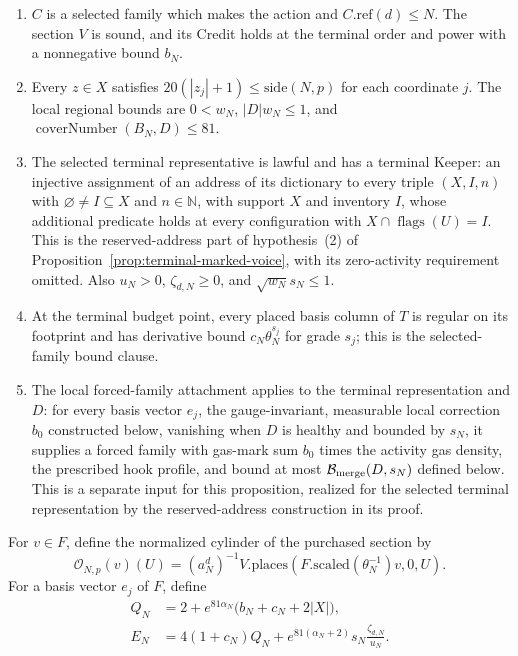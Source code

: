 \begin{enumerate}
\item $C$ is a selected family which makes the action and
  $C.\mathrm{ref}(d)\leq N$. The section $V$ is sound, and its Credit holds
  at the terminal order and power with a nonnegative bound $b_N$.
\item Every $z\in X$ satisfies
  $20(|z_j|+1)\leq\mathrm{side}(N,p)$ for each coordinate $j$.
  The local regional bounds are
  $0<w_N$, $|D|w_N\leq1$, and
  $\operatorname{coverNumber}(B_N,D)\leq81$.
\item The selected terminal representative is lawful and has a terminal
  Keeper: an injective assignment of an address of its dictionary to
  every triple $(X,I,n)$ with $\varnothing\neq I\subseteq X$ and
  $n\in\mathbb N$, with support $X$ and inventory $I$, whose additional
  predicate holds at every configuration with
  $X\cap\operatorname{flags}(U)=I$. This is the reserved-address part
  of hypothesis~(2) of Proposition~\ref{prop:terminal-marked-voice},
  with its zero-activity requirement omitted. Also $u_N>0$,
  $\zeta_{d,N}\geq0$, and $\sqrt{w_N}s_N\leq1$.
\item At the terminal budget point, every placed basis column of $T$ is
  regular on its footprint and has derivative bound
  $c_N\theta_N^{s_j}$ for grade $s_j$; this is the selected-family bound
  clause.
\item The local forced-family attachment applies to the terminal
  representation and $D$: for every basis vector $e_j$, the gauge-invariant,
  measurable local correction $b_0$ constructed below, vanishing when $D$
  is healthy and
  bounded by $s_N$, it supplies a forced family with gas-mark sum $b_0$
  times the activity gas density, the prescribed hook profile, and bound
  at most $\mathcal B_{\rm merge}(D,s_N)$ defined below. This is a
  separate input for this proposition, realized for the selected terminal
  representation by the reserved-address construction in its proof.
\end{enumerate}

For $v\in F$, define the normalized cylinder of the purchased section by
\[
 \mathcal O_{N,p}(v)(U)
   =(a_N^d)^{-1}V.\mathrm{places}(F.\mathrm{scaled}(\theta_N^{-1})v,0,U).
\]
For a basis vector $e_j$ of $F$, define
\begin{align*}
 Q_N&=2+e^{81\alpha_N}\bigl(b_N+c_N+2|X|\bigr),\\
 E_N&=4(1+c_N)Q_N
       +e^{81(\alpha_N+2)}s_N\frac{\zeta_{d,N}}{u_N}.
\end{align*}

